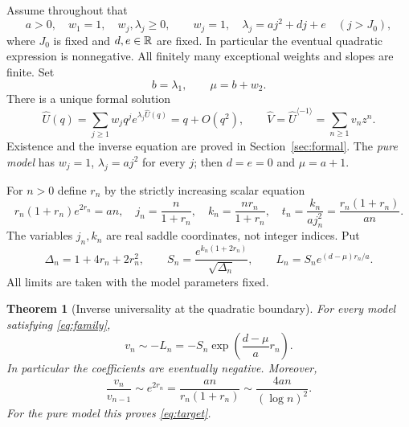 \documentclass[11pt,a4paper]{article}
\numberwithin{equation}{section}
\newtheorem{theorem}{Theorem}[section]
\theoremstyle{definition}
\theoremstyle{remark}
\newcommand{\Uhat}{\widehat U}\newcommand{\Vhat}{\widehat V}
\begin{document}
Assume throughout that
\begin{equation}
 a>0,\quad w_1=1,\quad w_j,\lambda_j\ge0,
 \qquad w_j=1,\quad \lambda_j=a j^2+d j+e\quad(j>J_0),
 \label{eq:family}
\end{equation}
where $J_0$ is fixed and $d,e\in\mathbb R$ are fixed. In particular the eventual
quadratic expression is nonnegative. All finitely many exceptional weights
and slopes are finite. Set
\begin{equation}
 b=\lambda_1,\qquad \mu=b+w_2.
 \label{eq:mu}
\end{equation}
There is a unique formal solution
\begin{equation}
 \Uhat(q)=\sum_{j\ge1}w_jq^j e^{\lambda_j\Uhat(q)}
          =q+O(q^2),
 \qquad \Vhat=\Uhat^{\langle-1\rangle}=\sum_{n\ge1}v_nz^n.
 \label{eq:model}
\end{equation}
Existence and the inverse equation are proved in Section~\ref{sec:formal}.
The \emph{pure model} has $w_j=1$, $\lambda_j=a j^2$ for every $j$;
then $d=e=0$ and $\mu=a+1$.

For $n>0$ define $r_n$ by the strictly increasing scalar equation
\begin{equation}
 r_n(1+r_n)e^{2r_n}=an,
 \quad j_n=\frac n{1+r_n},\quad k_n=\frac{nr_n}{1+r_n},
 \quad t_n=\frac{k_n}{a j_n^2}=\frac{r_n(1+r_n)}{an}.
 \label{eq:scales}
\end{equation}
The variables $j_n,k_n$ are real saddle coordinates, not integer indices.
Put
\begin{equation}
 \Delta_n=1+4r_n+2r_n^2,\qquad
 S_n=\frac{e^{k_n(1+2r_n)}}{\sqrt{\Delta_n}},\qquad
 L_n=S_n e^{(d-\mu)r_n/a}.
 \label{eq:leading}
\end{equation}
All limits are taken with the model parameters fixed.

\begin{theorem}[Inverse universality at the quadratic boundary]
\label{thm:main}
For every model satisfying \eqref{eq:family},
\begin{equation}
 \boxed{\qquad v_n\sim-L_n
 =-S_n\exp\!\left(\frac{d-\mu}{a}r_n\right).\qquad}
 \label{eq:main}
\end{equation}
In particular the coefficients are eventually negative. Moreover,
\begin{equation}
 \frac{v_n}{v_{n-1}}\sim e^{2r_n}
 =\frac{an}{r_n(1+r_n)}
 \sim\frac{4an}{(\log n)^2}.
 \label{eq:ratio}
\end{equation}
For the pure model this proves \eqref{eq:target}.
\end{theorem}
\end{document}
